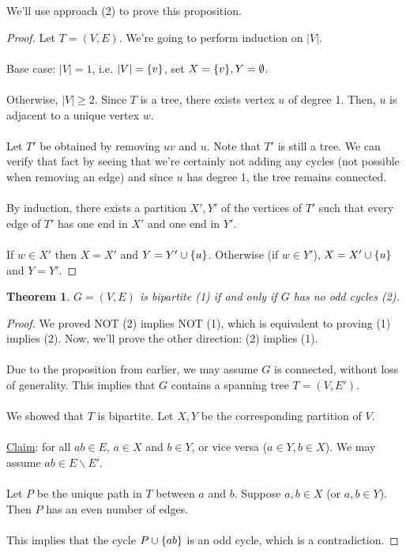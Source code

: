 \documentclass[]{article}
\newtheorem*{theorem}{Theorem}
\theoremstyle{definition}
\DeclarePairedDelimiter{\set}{\lbrace}{\rbrace}
\begin{document}
			We'll use approach (2) to prove this proposition.
			\begin{proof}
				Let $T = (V, E)$. We're going to perform induction on $|V|$.
				\\ \\
				Base case: $|V| = 1$, i.e. $|V| = \set{v}$, set $X = \set{v}, Y = \emptyset$.
				\\ \\
				Otherwise, $|V| \ge 2$. Since $T$ is a tree, there exists vertex $u$ of degree 1. Then, $u$ is adjacent to a unique vertex $w$.
				\\ \\
				Let $T'$ be obtained by removing $uv$ and $u$. Note that $T'$ is still a tree. We can verify that fact by seeing that we're certainly not adding any cycles (not possible when removing an edge) and since $u$ has degree 1, the tree remains connected.
				\\ \\
				By induction, there exists a partition $X', Y'$ of the vertices of $T'$ such that every edge of $T'$ has one end in $X'$ and one end in $Y'$.
				\\ \\
				If $w \in X'$ then $X = X'$ and $Y = Y' \cup \set{u}$. Otherwise (if $w \in Y'$), $X = X' \cup \set{u}$ and $Y = Y'$.
			\end{proof}

			\begin{theorem}
				$G = (V, E)$ is bipartite (1) if and only if $G$ has no odd cycles (2).
			\end{theorem}

			\begin{proof}
				We proved NOT (2) implies NOT (1), which is equivalent to proving (1) implies (2). Now, we'll prove the other direction: (2) implies (1).
				\\ \\
				Due to the proposition from earlier, we may assume $G$ is connected, without loss of generality. This implies that $G$ contains a spanning tree $T = (V, E')$.
				\\ \\
				We showed that $T$ is bipartite. Let $X, Y$ be the corresponding partition of $V$.
				\\ \\
				\underline{Claim}: for all $ab \in E$, $a \in X$ and $b \in Y$, or vice versa ($a \in Y, b \in X$). We may assume $ab \in E \backslash E'$.
				\\ \\
				Let $P$ be the unique path in $T$ between $a$ and $b$. Suppose $a, b \in X$ (or $a, b \in Y$). Then $P$ has an even number of edges.
				\\ \\
				This implies that the cycle $P \cup \set{ab}$ is an odd cycle, which is a contradiction.
			\end{proof}
			
\end{document}

